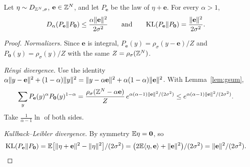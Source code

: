 \begin{lemma}\label{lem:renyi}
Let $\eta\sim D_{\mathbb{Z}^N,\sigma}$, $\mathbf e\in\mathbb{Z}^N$, and let $P_{\mathbf e}$ be the law of $\eta+\mathbf e$. For every $\alpha>1$,
\[
  D_\alpha(P_{\mathbf e}\Vert P_{\mathbf 0})\le\frac{\alpha\lVert \mathbf e\rVert^2}{2\sigma^2}
  \qquad\text{and}\qquad
  \mathrm{KL}(P_{\mathbf e}\Vert P_{\mathbf 0})=\frac{\lVert \mathbf e\rVert^2}{2\sigma^2}.
\]
\end{lemma}
\begin{proof}
\emph{Normalizers.} Since $\mathbf e$ is integral, $P_{\mathbf e}(y)=\rho_\sigma(y-\mathbf e)/Z$ and $P_{\mathbf 0}(y)=\rho_\sigma(y)/Z$ with the same $Z=\rho_\sigma(\mathbb{Z}^N)$.

\emph{R\'enyi divergence.} Use the identity $\alpha\lVert y-\mathbf e\rVert^2+(1-\alpha)\lVert y\rVert^2=\lVert y-\alpha\mathbf e\rVert^2+\alpha(1-\alpha)\lVert \mathbf e\rVert^2$. With Lemma~\ref{lem:gsum},
\[
  \sum_y P_{\mathbf e}(y)^\alpha P_{\mathbf 0}(y)^{1-\alpha}=\frac{\rho_\sigma(\mathbb{Z}^N-\alpha\mathbf e)}{Z}\,e^{\alpha(\alpha-1)\lVert \mathbf e\rVert^2/(2\sigma^2)}\le e^{\alpha(\alpha-1)\lVert \mathbf e\rVert^2/(2\sigma^2)} .
\]
Take $\frac1{\alpha-1}\ln$ of both sides.

\emph{Kullback--Leibler divergence.} By symmetry $\mathbb{E}\eta=\mathbf 0$, so
\[
  \mathrm{KL}(P_{\mathbf e}\Vert P_{\mathbf 0})=\mathbb{E}\bigl[\lVert \eta+\mathbf e\rVert^2-\lVert \eta\rVert^2\bigr]/(2\sigma^2)=\bigl(2\mathbb{E}\langle\eta,\mathbf e\rangle+\lVert \mathbf e\rVert^2\bigr)/(2\sigma^2)=\lVert \mathbf e\rVert^2/(2\sigma^2).
\]
\end{proof}

